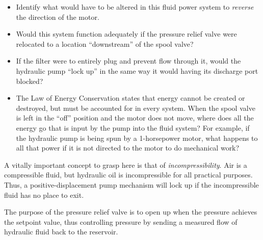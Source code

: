 \begin{itemize}
\item{} Identify what would have to be altered in this fluid power system to {\it reverse} the direction of the motor.
\item{} Would this system function adequately if the pressure relief valve were relocated to a location ``downstream'' of the spool valve?
\item{} If the filter were to entirely plug and prevent flow through it, would the hydraulic pump ``lock up'' in the same way it would having its discharge port blocked?  
\item{} The Law of Energy Conservation states that energy cannot be created or destroyed, but must be accounted for in every system.  When the spool valve is left in the ``off'' position and the motor does not move, where does all the energy go that is input by the pump into the fluid system?  For example, if the hydraulic pump is being spun by a 1-horsepower motor, what happens to all that power if it is not directed to the motor to do mechanical work?
\end{itemize}







A vitally important concept to grasp here is that of {\it incompressibility}.  Air is a compressible fluid, but hydraulic oil is incompressible for all practical purposes.  Thus, a positive-displacement pump mechanism will lock up if the incompressible fluid has no place to exit.







The purpose of the pressure relief valve is to open up when the pressure achieves the setpoint value, thus controlling pressure by sending a measured flow of hydraulic fluid back to the reservoir.




